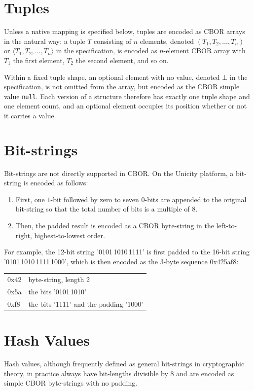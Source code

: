\section{Tuples}

Unless a native mapping is specified below, tuples are encoded as CBOR arrays in the natural way: a tuple $T$ consisting of $n$ elements, denoted $(T_1, T_2, \ldots, T_n)$ or $\langle T_1, T_2, \ldots, T_n \rangle$ in the specification, is encoded as $n$-element CBOR array with $T_1$ the first element, $T_2$ the second element, and so on.

Within a fixed tuple shape, an optional element with no value, denoted $\bot$ in the specification, is not omitted from the array, but encoded as the CBOR simple value \texttt{null}. Each version of a structure therefore has exactly one tuple shape and one element count, and an optional element occupies its position whether or not it carries a value.

\section{Bit-strings}

Bit-strings are not directly supported in CBOR. On the Unicity platform, a bit-string is encoded as follows:
\begin{enumerate}
\item First, one $1$-bit followed by zero to seven $0$-bits are appended to the original bit-string so that the total number of bits is a multiple of $8$.
\item Then, the padded result is encoded as a CBOR byte-string in the left-to-right, highest-to-lowest order.
\end{enumerate}

For example, the 12-bit string '0101\,1010\,1111' is first padded to the 16-bit string '0101\,1010\,1111\,1000', which is then encoded as the 3-byte sequence 0x425af8: \
\begin{tabular}{ll}
	\quad 0x42 & byte-string, length 2 \\
	\quad\quad 0x5a & the bits '0101\,1010' \\
	\quad\quad 0xf8 & the bits '1111' and the padding '1000'
\end{tabular}

\section{Hash Values}

Hash values, although frequently defined as general bit-strings in cryptographic theory, in practice always have bit-lengths divisible by 8 and are encoded as simple CBOR byte-strings with no padding.


